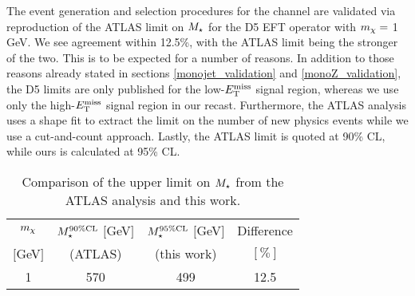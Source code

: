 The event generation and selection procedures for the \monoWZ channel are validated via reproduction of the ATLAS limit on $M_{\star}$ for the D5 EFT operator with $m_{\chi} = $ 1 GeV. We see agreement within 12.5\%, with the ATLAS limit being the stronger of the two. This is to be expected for a number of reasons. In addition to those reasons already stated in sections \ref{monojet_validation} and \ref{monoZ_validation}, the \monoWZ D5 limits are only published for the low-$E_{\mathrm{T}}^{\mathrm{miss}}$ signal region, whereas we use only the high-$E_{\mathrm{T}}^{\mathrm{miss}}$ signal region in our recast. Furthermore, the ATLAS analysis uses a shape fit to extract the limit on the number of new physics events while we use a cut-and-count approach. Lastly, the ATLAS limit is quoted at 90\% CL, while ours is calculated at 95\% CL.

\begin{table}
\begin{center}
\begin{tabular}{ c | c | c | c }
\hline
\hline
$m_{\chi}$ & $M_{\star}^{90\%\mathrm{CL}}$ $[$GeV$]$ & $M_{\star}^{95\%\mathrm{CL}}$ $[$GeV$]$  & Difference \T \\
$[$GeV$]$ & (ATLAS) & (this work) & $[\%]$ \B \\
\hline
1 & 570 & 499 & 12.5 \\
\hline
\hline
\end{tabular}
\end{center}
\caption{Comparison of the upper limit on $M_{\star}$ from the ATLAS \monoWZ analysis \cite{Aad:2013monoWZ} and this work.}
\label{tab:monoWZvalidation}
\end{table}
